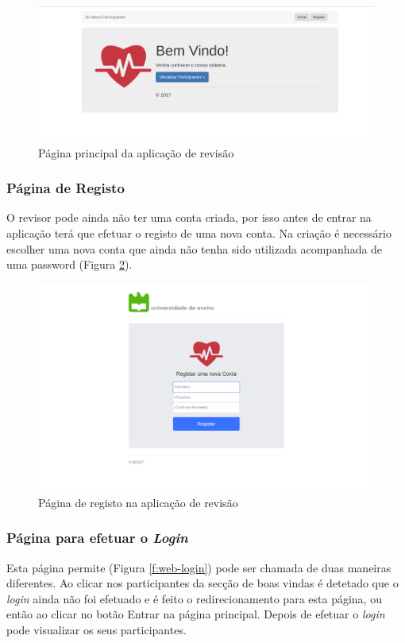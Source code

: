 \begin{figure}[H]
\centering
\includegraphics[width=1\textwidth]{imgs/home.png}
\caption[Página principal da aplicação de revisão]{Página principal da aplicação de revisão}
\label{f:web-home}
\end{figure}

\subsubsection{Página de Registo}
O revisor pode ainda não ter uma conta criada, por isso antes de entrar na aplicação terá que efetuar o registo de uma nova conta. Na criação é necessário escolher uma nova conta que ainda não tenha sido utilizada acompanhada de uma password (Figura \ref{f:web-registo}).

\begin{figure}[H]
\centering
\includegraphics[width=1\textwidth]{imgs/signup_web.png}
\caption[Página de registo na aplicação de revisão]{Página de registo na aplicação de revisão}
\label{f:web-registo}
\end{figure}

\subsubsection{Página para efetuar o \textit{Login}}
Esta página permite (Figura \ref{f:web-login}) pode ser chamada de duas maneiras diferentes. Ao clicar nos participantes da secção de boas vindas é detetado que o \textit{login} ainda não foi efetuado e é feito o redirecionamento para esta página, ou então ao clicar no botão Entrar na página principal. Depois de efetuar o \textit{login} pode visualizar os seus participantes.

